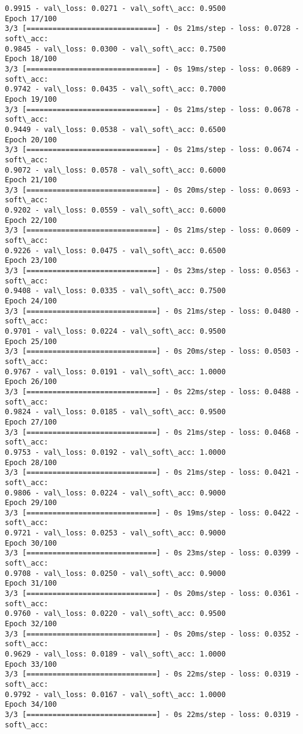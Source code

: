 \documentclass[11pt]{article}
\begin{document}
\begin{Verbatim}[commandchars=\\\{\}]
0.9915 - val\_loss: 0.0271 - val\_soft\_acc: 0.9500
Epoch 17/100
3/3 [==============================] - 0s 21ms/step - loss: 0.0728 - soft\_acc:
0.9845 - val\_loss: 0.0300 - val\_soft\_acc: 0.7500
Epoch 18/100
3/3 [==============================] - 0s 19ms/step - loss: 0.0689 - soft\_acc:
0.9742 - val\_loss: 0.0435 - val\_soft\_acc: 0.7000
Epoch 19/100
3/3 [==============================] - 0s 21ms/step - loss: 0.0678 - soft\_acc:
0.9449 - val\_loss: 0.0538 - val\_soft\_acc: 0.6500
Epoch 20/100
3/3 [==============================] - 0s 21ms/step - loss: 0.0674 - soft\_acc:
0.9072 - val\_loss: 0.0578 - val\_soft\_acc: 0.6000
Epoch 21/100
3/3 [==============================] - 0s 20ms/step - loss: 0.0693 - soft\_acc:
0.9202 - val\_loss: 0.0559 - val\_soft\_acc: 0.6000
Epoch 22/100
3/3 [==============================] - 0s 21ms/step - loss: 0.0609 - soft\_acc:
0.9226 - val\_loss: 0.0475 - val\_soft\_acc: 0.6500
Epoch 23/100
3/3 [==============================] - 0s 23ms/step - loss: 0.0563 - soft\_acc:
0.9408 - val\_loss: 0.0335 - val\_soft\_acc: 0.7500
Epoch 24/100
3/3 [==============================] - 0s 21ms/step - loss: 0.0480 - soft\_acc:
0.9701 - val\_loss: 0.0224 - val\_soft\_acc: 0.9500
Epoch 25/100
3/3 [==============================] - 0s 20ms/step - loss: 0.0503 - soft\_acc:
0.9767 - val\_loss: 0.0191 - val\_soft\_acc: 1.0000
Epoch 26/100
3/3 [==============================] - 0s 22ms/step - loss: 0.0488 - soft\_acc:
0.9824 - val\_loss: 0.0185 - val\_soft\_acc: 0.9500
Epoch 27/100
3/3 [==============================] - 0s 21ms/step - loss: 0.0468 - soft\_acc:
0.9753 - val\_loss: 0.0192 - val\_soft\_acc: 1.0000
Epoch 28/100
3/3 [==============================] - 0s 21ms/step - loss: 0.0421 - soft\_acc:
0.9806 - val\_loss: 0.0224 - val\_soft\_acc: 0.9000
Epoch 29/100
3/3 [==============================] - 0s 19ms/step - loss: 0.0422 - soft\_acc:
0.9721 - val\_loss: 0.0253 - val\_soft\_acc: 0.9000
Epoch 30/100
3/3 [==============================] - 0s 23ms/step - loss: 0.0399 - soft\_acc:
0.9708 - val\_loss: 0.0250 - val\_soft\_acc: 0.9000
Epoch 31/100
3/3 [==============================] - 0s 20ms/step - loss: 0.0361 - soft\_acc:
0.9760 - val\_loss: 0.0220 - val\_soft\_acc: 0.9500
Epoch 32/100
3/3 [==============================] - 0s 20ms/step - loss: 0.0352 - soft\_acc:
0.9629 - val\_loss: 0.0189 - val\_soft\_acc: 1.0000
Epoch 33/100
3/3 [==============================] - 0s 22ms/step - loss: 0.0319 - soft\_acc:
0.9792 - val\_loss: 0.0167 - val\_soft\_acc: 1.0000
Epoch 34/100
3/3 [==============================] - 0s 22ms/step - loss: 0.0319 - soft\_acc:

\end{Verbatim}
\end{document}
